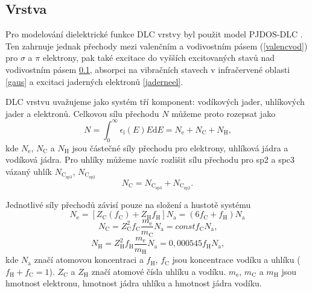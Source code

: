 \subsection{Vrstva}
Pro modelování dielektrické funkce DLC vrstvy byl použit model PJDOS-DLC \cite{franta2007}. Ten zahrnuje jednak přechody mezi valenčním a vodivostním pásem (\ref{valencvod}) pro $\sigma$ a $\pi$ elektrony, pak také excitace do vyšších excitovaných stavů nad vodivostním pásem \ref{}, absorpci na vibračních stavech v infračervené oblasti \ref{gaus} a excitaci jaderných elektronů \ref{jaderneel}. 

DLC vrstvu uvažujeme jako systém tří komponent: vodíkových jader, uhlíkových jader a elektronů. Celkovou sílu přechodu $N$ můžeme proto rozepsat jako
\begin{equation}
N = \int_0^\infty \epsilon_\mathrm{i}(E) E \mathrm{d}E = N_\mathrm{e} + N_\mathrm{C} + N_\mathrm{H} \text{,}
\end{equation} 
kde $N_\mathrm{e}$, $N_\mathrm{C}$ a $N_\mathrm{H}$ jsou částečné síly přechodu pro elektrony, uhlíková jádra a vodíková jádra. Pro uhlíky můžeme navíc rozlišit sílu přechodu pro sp2 a spc3 vázaný uhlík $N_\mathrm{C_{sp3}}$, $N_\mathrm{C_{sp2}}$
\begin{equation}
N_\mathrm{C} = N_\mathrm{C_{sp3}} + N_\mathrm{C_{sp2}} \text{.}
\end{equation} 

Jednotlivé síly přechodů závisí pouze na složení a hustotě systému
\begin{equation}
N_\mathrm{e} = [Z_\mathrm{C}(f_\mathrm{C}) + Z_\mathrm{H} f_\mathrm{H}] N_\mathrm{a} = (6f_\mathrm{C} + f_\mathrm{H})N_\mathrm{a}
\end{equation}
\begin{equation}
N_\mathrm{C} = Z^2_\mathrm{C} f_\mathrm{C} \frac{m_\mathrm{e}}{m_\mathrm{C}} N_\mathrm{a} = const f_\mathrm{C} N_\mathrm{a} \text{,}
\end{equation}
\begin{equation}
N_\mathrm{H} = Z^2_\mathrm{H} f_\mathrm{H} \frac{m_\mathrm{e}}{m_\mathrm{H}} N_\mathrm{a} = 0,000545 f_\mathrm{H} N_\mathrm{a} \text{,}
\end{equation}
kde $N_\mathrm{a}$ značí atomovou koncentraci a $f_\mathrm{H}$, $f_\mathrm{C}$ jsou koncentrace vodíku a uhlíku ($f_\mathrm{H} + f_\mathrm{C} = 1 $). $Z_\mathrm{C}$ a $Z_\mathrm{H}$ značí atomové čísla uhlíku a vodíku. $m_\mathrm{e}$, $m_\mathrm{C}$ a $m_\mathrm{H}$ jsou hmotnost elektronu, hmotnost jádra uhlíku a hmotnost jádra vodíku. 


